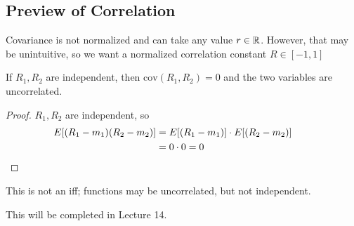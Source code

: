 \subsection{Preview of Correlation}
Covariance is not normalized and can take any value $r \in \mathbb{R}$. However, that may be unintuitive, so we want a normalized correlation constant $R \in [-1,1]$
\begin{proposition}
    If $R_1,R_2$ are independent, then $\text{cov}(R_1,R_2) = 0$ and the two variables are uncorrelated.
    \begin{proof}
        $R_1,R_2$ are independent, so
        \begin{align}
            E\qty[(R_1-m_1)(R_2-m_2)] &= E\qty[(R_1-m_1)] \cdot E\qty[(R_2-m_2)]\\
            &= 0 \cdot 0 = 0 && \qedhere
        \end{align}
    \end{proof}
    This is not an iff; functions may be uncorrelated, but not independent.
\end{proposition}
This will be completed in Lecture 14.

